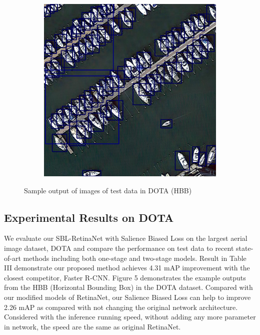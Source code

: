 \documentclass[conference]{IEEEtran}
\begin{document}
\begin{figure}[h!]
\begin{subfigure}[b]{0.4\linewidth}
   	\end{subfigure}
  	\begin{subfigure}[b]{0.4\linewidth}
    	\includegraphics[width=\linewidth]{P0031__1__3696___2771.png}
  	\end{subfigure}
  	\caption{Sample output of  images of test data in DOTA (HBB)}
  	\label{fig:sample data}
	\end{figure}
    \subsection{Experimental Results on DOTA}
    We evaluate our SBL-RetinaNet with Salience Biased Loss on the largest aerial image dataset, DOTA and compare the performance on test data to recent state-of-art methods including both one-stage and two-stage models. Result in Table III demonstrate our proposed method achieves 4.31 mAP improvement with the closest competitor, Faster R-CNN\cite{ren2015faster}. Figure 5 demonstrates the example outputs from the HBB (Horizontal Bounding Box) in the DOTA dataset. Compared with  our modified models of RetinaNet\cite{lin2017focal}, our Salience Biased Loss can help to improve 2.26 mAP as compared with not changing the original network architecture. Considered with the inference running speed, without adding any more parameter in network, the speed are the same as original RetinaNet\cite{lin2017focal}. 
   
\end{document}
